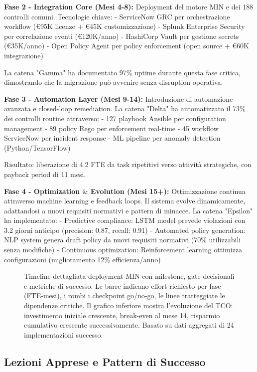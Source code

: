 \textbf{Fase 2 - Integration Core (Mesi 4-8):}
Deployment del motore MIN e dei 188 controlli comuni. Tecnologie chiave:
- ServiceNow GRC per orchestrazione workflow (€95K licenze + €45K customizzazione)
- Splunk Enterprise Security per correlazione eventi (€120K/anno)
- HashiCorp Vault per gestione secrets (€35K/anno)
- Open Policy Agent per policy enforcement (open source + €60K integrazione)

La catena "Gamma" ha documentato 97\% uptime durante questa fase critica, dimostrando che la migrazione può avvenire senza disruption operativa.

\textbf{Fase 3 - Automation Layer (Mesi 9-14):}
Introduzione di automazione avanzata e closed-loop remediation. La catena "Delta" ha automatizzato il 73\% dei controlli routine attraverso:
- 127 playbook Ansible per configuration management
- 89 policy Rego per enforcement real-time
- 45 workflow ServiceNow per incident response
- ML pipeline per anomaly detection (Python/TensorFlow)

Risultato: liberazione di 4.2 FTE da task ripetitivi verso attività strategiche, con payback period di 11 mesi.

\textbf{Fase 4 - Optimization $\&$ Evolution (Mesi 15+):}
Ottimizzazione continua attraverso machine learning e feedback loops. Il sistema evolve dinamicamente, adattandosi a nuovi requisiti normativi e pattern di minacce. La catena "Epsilon" ha implementato:
- Predictive compliance: LSTM model prevede violazioni con 3.2 giorni anticipo (precision: 0.87, recall: 0.91)
- Automated policy generation: NLP system genera draft policy da nuovi requisiti normativi (70\% utilizzabili senza modifiche)
- Continuous optimization: Reinforcement learning ottimizza configurazioni (miglioramento 12\% efficienza/anno)

\begin{figure}[htbp]
\centering
\caption{Timeline dettagliata deployment MIN con milestone, gate decisionali e metriche di successo. Le barre indicano effort richiesto per fase (FTE-mesi), i rombi i checkpoint go/no-go, le linee tratteggiate le dipendenze critiche. Il grafico inferiore mostra l'evoluzione del TCO: investimento iniziale crescente, break-even al mese 14, risparmio cumulativo crescente successivamente. Basato su dati aggregati di 24 implementazioni successo.}
\label{fig:deployment_timeline}
\end{figure}

\subsection{Lezioni Apprese e Pattern di Successo}

